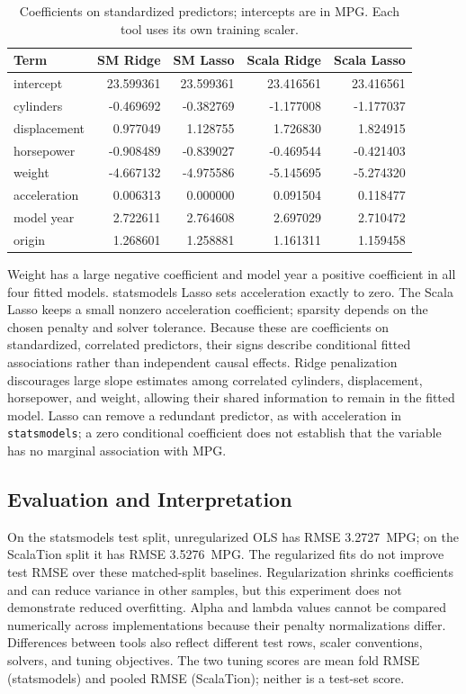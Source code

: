 \documentclass{article}
\begin{document}
\begin{table}[H]
\centering\small
\caption{Coefficients on standardized predictors; intercepts are in MPG. Each tool uses its own training scaler.}
\label{tab:regularized-coefficients}
\begin{tabular}{lrrrr}
\toprule
Term & SM Ridge & SM Lasso & Scala Ridge & Scala Lasso \\
\midrule
intercept & 23.599361 & 23.599361 & 23.416561 & 23.416561 \\
cylinders & -0.469692 & -0.382769 & -1.177008 & -1.177037 \\
displacement & 0.977049 & 1.128755 & 1.726830 & 1.824915 \\
horsepower & -0.908489 & -0.839027 & -0.469544 & -0.421403 \\
weight & -4.667132 & -4.975586 & -5.145695 & -5.274320 \\
acceleration & 0.006313 & 0.000000 & 0.091504 & 0.118477 \\
model year & 2.722611 & 2.764608 & 2.697029 & 2.710472 \\
origin & 1.268601 & 1.258881 & 1.161311 & 1.159458 \\
\bottomrule
\end{tabular}
\end{table}

Weight has a large negative coefficient and model year a positive coefficient in all four fitted models. statsmodels Lasso sets acceleration exactly to zero. The Scala Lasso keeps a small nonzero acceleration coefficient; sparsity depends on the chosen penalty and solver tolerance. Because these are coefficients on standardized, correlated predictors, their signs describe conditional fitted associations rather than independent causal effects. Ridge penalization discourages large slope estimates among correlated cylinders, displacement, horsepower, and weight, allowing their shared information to remain in the fitted model. Lasso can remove a redundant predictor, as with acceleration in \texttt{statsmodels}; a zero conditional coefficient does not establish that the variable has no marginal association with MPG.

\subsection{Evaluation and Interpretation}

On the statsmodels test split, unregularized OLS has RMSE 3.2727~MPG; on the ScalaTion split it has RMSE 3.5276~MPG. The regularized fits do not improve test RMSE over these matched-split baselines. Regularization shrinks coefficients and can reduce variance in other samples, but this experiment does not demonstrate reduced overfitting. Alpha and lambda values cannot be compared numerically across implementations because their penalty normalizations differ. Differences between tools also reflect different test rows, scaler conventions, solvers, and tuning objectives. The two tuning scores are mean fold RMSE (statsmodels) and pooled RMSE (ScalaTion); neither is a test-set score.
\end{document}
